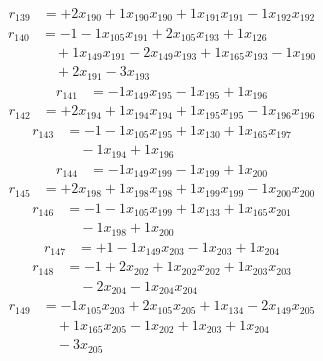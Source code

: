 \[\begin{aligned}
r_{139} &= + 2 x_{190} + 1 x_{190} x_{190} + 1 x_{191} x_{191} - 1 x_{192} x_{192}
\end{aligned}\]
\[\begin{aligned}
r_{140} &= - 1 - 1 x_{105} x_{191} + 2 x_{105} x_{193} + 1 x_{126} \\
 &\quad + 1 x_{149} x_{191} - 2 x_{149} x_{193} + 1 x_{165} x_{193} - 1 x_{190} \\
 &\quad + 2 x_{191} - 3 x_{193}
\end{aligned}\]
\[\begin{aligned}
r_{141} &= - 1 x_{149} x_{195} - 1 x_{195} + 1 x_{196}
\end{aligned}\]
\[\begin{aligned}
r_{142} &= + 2 x_{194} + 1 x_{194} x_{194} + 1 x_{195} x_{195} - 1 x_{196} x_{196}
\end{aligned}\]
\[\begin{aligned}
r_{143} &= - 1 - 1 x_{105} x_{195} + 1 x_{130} + 1 x_{165} x_{197} \\
 &\quad - 1 x_{194} + 1 x_{196}
\end{aligned}\]
\[\begin{aligned}
r_{144} &= - 1 x_{149} x_{199} - 1 x_{199} + 1 x_{200}
\end{aligned}\]
\[\begin{aligned}
r_{145} &= + 2 x_{198} + 1 x_{198} x_{198} + 1 x_{199} x_{199} - 1 x_{200} x_{200}
\end{aligned}\]
\[\begin{aligned}
r_{146} &= - 1 - 1 x_{105} x_{199} + 1 x_{133} + 1 x_{165} x_{201} \\
 &\quad - 1 x_{198} + 1 x_{200}
\end{aligned}\]
\[\begin{aligned}
r_{147} &= + 1 - 1 x_{149} x_{203} - 1 x_{203} + 1 x_{204}
\end{aligned}\]
\[\begin{aligned}
r_{148} &= - 1 + 2 x_{202} + 1 x_{202} x_{202} + 1 x_{203} x_{203} \\
 &\quad - 2 x_{204} - 1 x_{204} x_{204}
\end{aligned}\]
\[\begin{aligned}
r_{149} &= - 1 x_{105} x_{203} + 2 x_{105} x_{205} + 1 x_{134} - 2 x_{149} x_{205} \\
 &\quad + 1 x_{165} x_{205} - 1 x_{202} + 1 x_{203} + 1 x_{204} \\
 &\quad - 3 x_{205}
\end{aligned}\]
